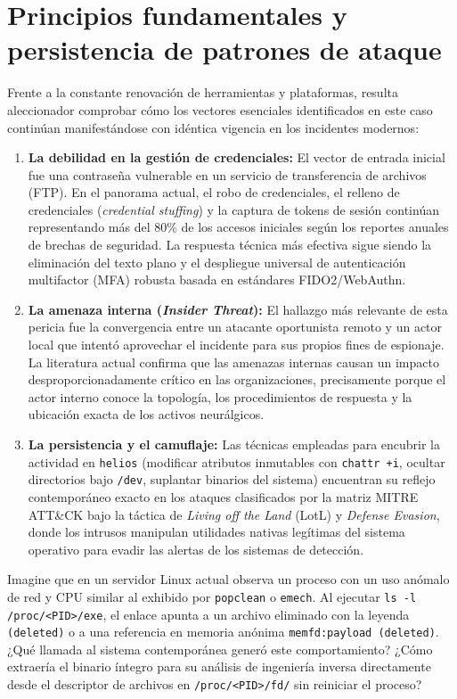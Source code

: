 \section{Principios fundamentales y persistencia de patrones de ataque}

Frente a la constante renovación de herramientas y plataformas, resulta aleccionador comprobar cómo los vectores esenciales identificados en este caso continúan manifestándose con idéntica vigencia en los incidentes modernos:

\begin{enumerate}
    \item \textbf{La debilidad en la gestión de credenciales:} El vector de entrada inicial fue una contraseña vulnerable en un servicio de transferencia de archivos (FTP). En el panorama actual, el robo de credenciales, el relleno de credenciales (\textit{credential stuffing}) y la captura de tokens de sesión continúan representando más del 80\% de los accesos iniciales según los reportes anuales de brechas de seguridad. La respuesta técnica más efectiva sigue siendo la eliminación del texto plano y el despliegue universal de autenticación multifactor (MFA) robusta basada en estándares FIDO2/WebAuthn.
    \item \textbf{La amenaza interna (\textit{Insider Threat}):} El hallazgo más relevante de esta pericia fue la convergencia entre un atacante oportunista remoto y un actor local que intentó aprovechar el incidente para sus propios fines de espionaje. La literatura actual confirma que las amenazas internas causan un impacto desproporcionadamente crítico en las organizaciones, precisamente porque el actor interno conoce la topología, los procedimientos de respuesta y la ubicación exacta de los activos neurálgicos.
    \item \textbf{La persistencia y el camuflaje:} Las técnicas empleadas para encubrir la actividad en \texttt{helios} (modificar atributos inmutables con \texttt{chattr +i}, ocultar directorios bajo \texttt{/dev}, suplantar binarios del sistema) encuentran su reflejo contemporáneo exacto en los ataques clasificados por la matriz MITRE ATT\&CK bajo la táctica de \textit{Living off the Land} (LotL) y \textit{Defense Evasion}, donde los intrusos manipulan utilidades nativas legítimas del sistema operativo para evadir las alertas de los sistemas de detección.
\end{enumerate}

\begin{retoforense}
Imagine que en un servidor Linux actual observa un proceso con un uso anómalo de red y CPU similar al exhibido por \texttt{popclean} o \texttt{emech}. Al ejecutar \texttt{ls -l /proc/<PID>/exe}, el enlace apunta a un archivo eliminado con la leyenda \texttt{(deleted)} o a una referencia en memoria anónima \texttt{memfd:payload (deleted)}.
¿Qué llamada al sistema contemporánea generó este comportamiento? ¿Cómo extraería el binario íntegro para su análisis de ingeniería inversa directamente desde el descriptor de archivos en \texttt{/proc/<PID>/fd/} sin reiniciar el proceso?
\end{retoforense}

